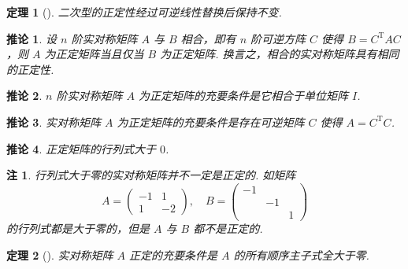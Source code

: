\documentclass[zihao=-4,UTF8,linespread=1.8,nothm]{aytony_base}
\newtheorem{theorem}{\indent 定理}[subsection]
\newtheorem*{corollary}{\indent 推论}
\newtheorem*{remark}{\indent 注}
\begin{document}
\begin{theorem}[]
    二次型的正定性经过可逆线性替换后保持不变.
\end{theorem}

\begin{corollary}
    设 $n$ 阶实对称矩阵 $A$ 与 $B$ 相合，即有 $n$ 阶可逆方阵 $C$ 使得 $B = C ^{\mathrm{T}}AC$，则 $A$ 为正定矩阵当且仅当 $B$ 为正定矩阵. 换言之，相合的实对称矩阵具有相同的正定性.
\end{corollary}

\begin{corollary}
    $n$ 阶实对称矩阵 $A$ 为正定矩阵的充要条件是它相合于单位矩阵 $I$.
\end{corollary}

\begin{corollary}
    实对称矩阵 $A$ 为正定矩阵的充要条件是存在可逆矩阵 $C$ 使得 $A = C ^{\mathrm{T}} C$.
\end{corollary}

\begin{corollary}
    正定矩阵的行列式大于 $0$.
\end{corollary}

\begin{remark}
    行列式大于零的实对称矩阵并不一定是正定的. 如矩阵 $$
        A = \left(
        \begin{matrix}
            -1 & 1  \\
            1  & -2
        \end{matrix}
        \right),\quad B = \left(
        \begin{matrix}
            -1 &    &   \\
               & -1 &   \\
               &    & 1
        \end{matrix}
        \right)
    $$ 的行列式都是大于零的，但是 $A$ 与 $B$ 都不是正定的.
\end{remark}

\begin{theorem}[]
    实对称矩阵 $A$ 正定的充要条件是 $A$ 的所有顺序主子式全大于零.
\end{theorem}
\end{document}
